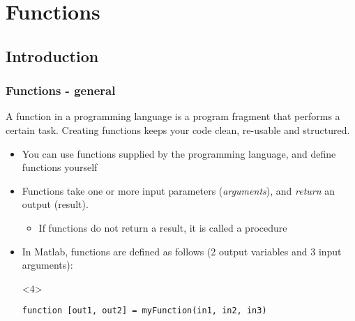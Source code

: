 \section{Functions}
\subsection*{Introduction}
\begin{frame}[fragile]
 \frametitle{Functions - general}
 A function in a programming language is a program fragment that performs a certain task. Creating functions keeps your code clean, re-usable and structured.
 \begin{itemize}
    \item You can use functions supplied by the programming language, and define functions yourself
    \item Functions take one or more input parameters (\emph{arguments}), and \emph{return} an output (result).
   \begin{itemize}
      \item If functions do not return a result, it is called a procedure
   \end{itemize}
    \item In Matlab, functions are defined as follows (2 output variables and 3 input arguments):
  \begin{overlayarea}{\textwidth}{2em}
   \begin{onlyenv}<4>
    \begin{lstlisting}
function [out1, out2] = myFunction(in1, in2, in3)
    \end{lstlisting}
    \end{onlyenv}
   \end{overlayarea}
  \end{itemize}
\end{frame}

